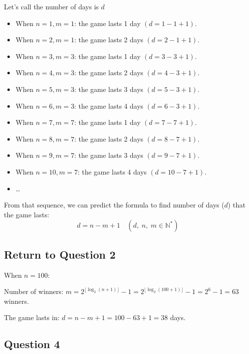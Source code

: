 \documentclass[12pt]{article}
\begin{document}
\noindent Let's call the number of days is $d$\par
\begin{itemize}
    \item When $n=1, m=1$: the game lasts 1 day $\left(d=1-1+1\right)$.
    \item When $n=2, m=1$: the game lasts 2 days $\left(d=2-1+1\right)$.
    \item When $n=3, m=3$: the game lasts 1 day $\left(d=3-3+1\right)$.
    \item When $n=4, m=3$: the game lasts 2 days $\left(d=4-3+1\right)$.
    \item When $n=5, m=3$: the game lasts 3 days $\left(d=5-3+1\right)$.
    \item When $n=6, m=3$: the game lasts 4 days $\left(d=6-3+1\right)$.
    \item When $n=7, m=7$: the game lasts 1 day $\left(d=7-7+1\right)$.
    \item When $n=8, m=7$: the game lasts 2 days $\left(d=8-7+1\right)$.
    \item When $n=9, m=7$: the game lasts 3 days $\left(d=9-7+1\right)$.
    \item When $n=10, m=7$: the game lasts 4 days $\left(d=10-7+1\right)$.
    \item \dots
\end{itemize}

\noindent From that sequence, we can predict the formula to find number of days ($d$) that the game lasts:
$$d=n-m+1\quad \left(d,\;n,\; m\in \mathbb{N^*} \right)$$


\vspace{1cm}

\subsection*{Return to Question 2}

\noindent When $n=100$:

\noindent Number of winners: $m=2^{\lfloor \log_2 \left(n+1 \right) \rfloor} -1= 2^{\lfloor\log_2 \left(100+1 \right) \rfloor} -1 = 2^6-1 = 63$ winners.

\noindent The game lasts in: $d=n-m+1= 100- 63 +1 = 38$ days.

\vspace{1cm}

\subsection*{Question 4}
\end{document}

